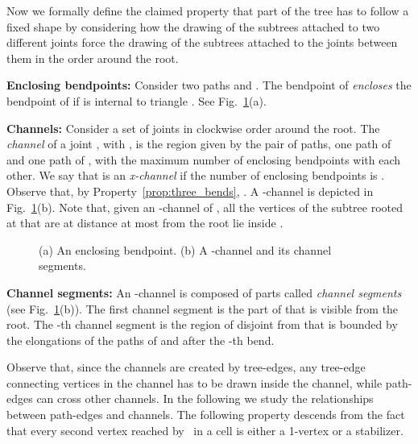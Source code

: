 \documentclass[a4paper,10pt]{llncs}
\newcounter{prop}
\renewcommand{\P}{\mbox{ }}
\begin{document}
Now we formally define the claimed property that part of the tree has to follow a fixed shape by considering how the drawing of the subtrees attached to two different joints force the drawing of the subtrees attached to the joints between them in the order around the root.

{\bf Enclosing bendpoints:}
Consider two paths  and . The bendpoint  of  \emph{encloses} the bendpoint  of  if  is internal to triangle . See Fig.~\ref{fig:bendpoint}(a).

{\bf Channels:}
Consider a set of joints  in clockwise order around the root. The \emph{channel}  of a joint , with , is the region given by the pair of paths, one path of  and one path of , with the maximum number of enclosing bendpoints with each other. We say that  is an \emph{x-channel} if the number of enclosing bendpoints is . Observe that, by Property~\ref{prop:three_bends}, . A -channel is depicted in Fig.~\ref{fig:bendpoint}(b). Note that, given an -channel  of , all the vertices of the subtree rooted at  that are at distance at most  from the root lie inside .

\begin{figure}[tb]
\caption{(a) An enclosing bendpoint. (b) A -channel and its channel segments.}\label{fig:bendpoint}
\end{figure}

{\bf Channel segments:}
An -channel  is composed of  parts called \emph{channel segments} (see Fig.~\ref{fig:bendpoint}(b)). The first channel segment  is the part of  that is visible from the root. The -th channel segment  is the region of  disjoint from  that is bounded by the elongations of the paths of  and  after the -th bend.

Observe that, since the channels are created by tree-edges, any tree-edge connecting vertices in the channel has to be drawn inside the channel, while path-edges can cross other channels. In the following we study the relationships between path-edges and channels. The following property descends from the fact that every second vertex reached by \P in a cell is either a 1-vertex or a stabilizer.
\end{document}
